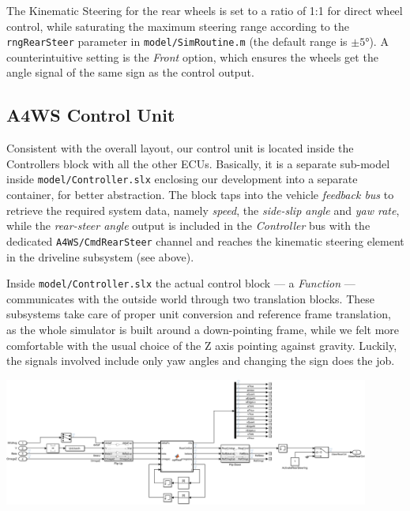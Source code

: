 		The Kinematic Steering for the rear wheels is set to a ratio of 1:1 for direct wheel control, while saturating the maximum steering range according to the
		\lstinline{rngRearSteer} parameter in \texttt{model/SimRoutine.m} (the default range is $\pm\ang{5}$). A counterintuitive setting is the \emph{Front} option,
		which ensures the wheels get the angle signal of the same sign as the control output.


		\subsection{A4WS Control Unit}
		\label{ssec:vs-int-ctrl}

		Consistent with the overall layout, our \emph{\awwwws} control unit is located inside the Controllers block with all the other ECUs.
		Basically, it is a separate \mwSL{} sub-model inside \texttt{model/Controller.slx} enclosing our development into a separate container, for better abstraction.
		The block taps into the vehicle \emph{feedback bus} to retrieve the required system data, namely \emph{speed}, the \emph{side-slip angle} and \emph{yaw rate},
		while the \emph{rear-steer angle} output is included in the \emph{Controller} bus with the dedicated \lstinline{A4WS/CmdRearSteer} channel and reaches the kinematic
		steering element in the driveline subsystem (see above).

		Inside \texttt{model/Controller.slx} the actual control block --- a \emph{\mwML{} Function} --- communicates with the outside world through two translation blocks.
		These subsystems take care of proper unit conversion and reference frame translation, as the whole simulator is built around a down-pointing frame, while we felt
		more comfortable with the usual choice of the Z axis pointing against gravity. Luckily, the signals involved include only yaw angles and changing the sign does the job.
		\begin{center}
			\includegraphics[width=0.9\textwidth]{Images/Simulator/a4ws-full}
		\end{center}

